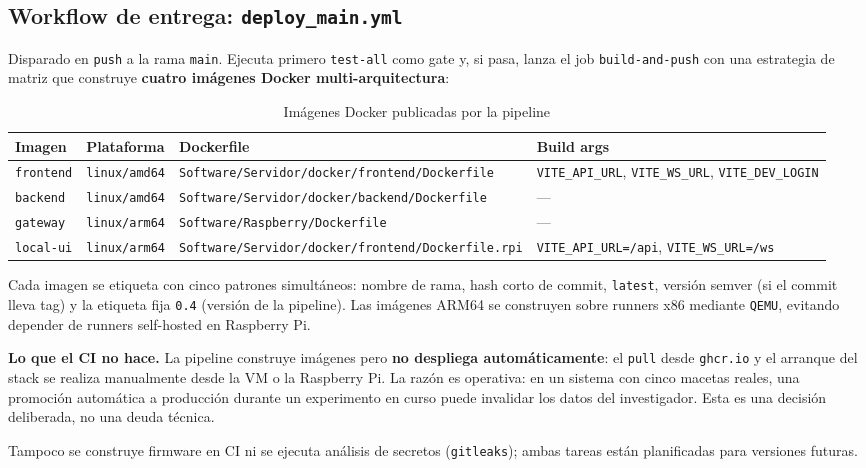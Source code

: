 \subsection{Workflow de entrega: \texttt{deploy\_main.yml}}

Disparado en \texttt{push} a la rama \texttt{main}. Ejecuta primero
\texttt{test-all} como gate y, si pasa, lanza el job \texttt{build-and-push} con una
estrategia de matriz que construye \textbf{cuatro imágenes Docker multi-arquitectura}:

\begin{table}[H]
    \centering
    \caption{Imágenes Docker publicadas por la pipeline}
    \begin{tabularx}{\textwidth}{lllX}
        \toprule
        \textbf{Imagen}    & \textbf{Plataforma} & \textbf{Dockerfile}                                          & \textbf{Build args} \\
        \midrule
        \texttt{frontend}  & \texttt{linux/amd64} & \texttt{Software/Servidor/docker/frontend/Dockerfile}        & \texttt{VITE\_API\_URL}, \texttt{VITE\_WS\_URL}, \texttt{VITE\_DEV\_LOGIN} \\
        \texttt{backend}   & \texttt{linux/amd64} & \texttt{Software/Servidor/docker/backend/Dockerfile}         & --- \\
        \texttt{gateway}   & \texttt{linux/arm64} & \texttt{Software/Raspberry/Dockerfile}                       & --- \\
        \texttt{local-ui}  & \texttt{linux/arm64} & \texttt{Software/Servidor/docker/frontend/Dockerfile.rpi}    & \texttt{VITE\_API\_URL=/api}, \texttt{VITE\_WS\_URL=/ws} \\
        \bottomrule
    \end{tabularx}
    \label{tab:ghcr_images}
\end{table}

Cada imagen se etiqueta con cinco patrones simultáneos: nombre de rama, hash corto
de commit, \texttt{latest}, versión semver (si el commit lleva tag) y la etiqueta
fija \texttt{0.4} (versión de la pipeline). Las imágenes ARM64 se construyen sobre
runners x86 mediante \texttt{QEMU}, evitando depender de runners self-hosted en
Raspberry Pi.

\begin{warningbox}
\textbf{Lo que el CI no hace.} La pipeline construye imágenes pero
\textbf{no despliega automáticamente}: el \texttt{pull} desde \texttt{ghcr.io} y el
arranque del stack se realiza manualmente desde la VM o la Raspberry Pi. La razón
es operativa: en un sistema con cinco macetas reales, una promoción automática a
producción durante un experimento en curso puede invalidar los datos del
investigador. Esta es una decisión deliberada, no una deuda técnica.

Tampoco se construye firmware en CI ni se ejecuta análisis de secretos
(\texttt{gitleaks}); ambas tareas están planificadas para versiones futuras.
\end{warningbox}

